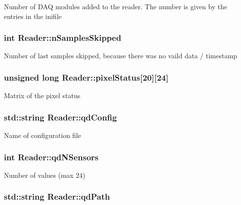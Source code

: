Number of D\-A\-Q modules added to the reader. The number is given by the entries in the inifile \hypertarget{classReader_a4b6268d4969e7209ea2c7fea25d09a58}{
\subsubsection[{n\-Samples\-Skipped}]{\setlength{\rightskip}{0pt plus 5cm}int Reader\-::n\-Samples\-Skipped\hspace{0.3cm}{\ttfamily [private]}}}\label{classReader_a4b6268d4969e7209ea2c7fea25d09a58}
Number of last samples skipped, because there was no vaild data / timestamp \hypertarget{classReader_a03046b6de7c2adc07bc85fffd69d78b1}{
\subsubsection[{pixel\-Status}]{\setlength{\rightskip}{0pt plus 5cm}unsigned long Reader\-::pixel\-Status\mbox{[}20\mbox{]}\mbox{[}24\mbox{]}\hspace{0.3cm}{\ttfamily [private]}}}\label{classReader_a03046b6de7c2adc07bc85fffd69d78b1}
Matrix of the pixel status \hypertarget{classReader_ab0da569b087b0ba5efdb22ee8459e40d}{
\subsubsection[{qd\-Config}]{\setlength{\rightskip}{0pt plus 5cm}std\-::string Reader\-::qd\-Config\hspace{0.3cm}{\ttfamily [private]}}}\label{classReader_ab0da569b087b0ba5efdb22ee8459e40d}
Name of configuration file \hypertarget{classReader_a1807cf089712f144cbf20b280dc36240}{
\subsubsection[{qd\-N\-Sensors}]{\setlength{\rightskip}{0pt plus 5cm}int Reader\-::qd\-N\-Sensors\hspace{0.3cm}{\ttfamily [private]}}}\label{classReader_a1807cf089712f144cbf20b280dc36240}
Number of values (max 24) \hypertarget{classReader_ad92d8d94dae6b66a5278cb792ca0a206}{
\subsubsection[{qd\-Path}]{\setlength{\rightskip}{0pt plus 5cm}std\-::string Reader\-::qd\-Path\hspace{0.3cm}{\ttfamily [private]}}}\label{classReader_ad92d8d94dae6b66a5278cb792ca0a206}
